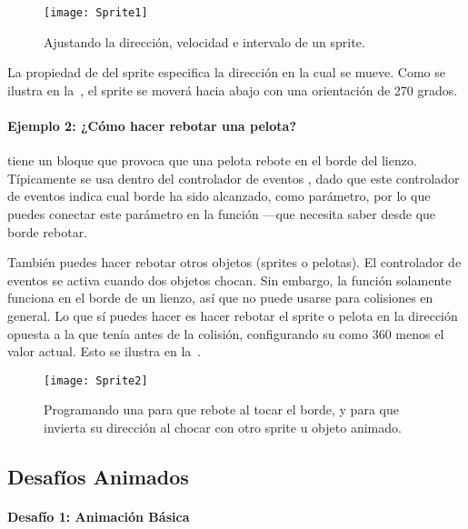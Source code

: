 \begin{figure}[H]
\centering
\texttt{[image: Sprite1]}
\caption{Ajustando la dirección, velocidad e intervalo de un sprite.}
\label{fig:Sprite1}
\end{figure}

La propiedad de  del sprite especifica la
dirección en la cual se mueve. Como se ilustra en
la~, el sprite se moverá hacia abajo con una
orientación de 270 grados.

\paragraph{Ejemplo 2: ¿Cómo hacer rebotar una pelota?}

\AppInventor tiene un bloque  que provoca que una pelota
rebote en el borde del lienzo. Típicamente se usa  dentro
del controlador de eventos , dado que este
controlador de eventos indica cual borde ha sido alcanzado, como
parámetro, por lo que puedes conectar este parámetro en la función
---que necesita saber desde que borde rebotar.

También puedes hacer rebotar otros objetos (sprites o pelotas). El
controlador de eventos  se activa cuando dos
objetos chocan. Sin embargo, la función  solamente
funciona en el borde de un lienzo, así que no puede usarse para
colisiones en general. Lo que sí puedes hacer es hacer rebotar el
sprite o pelota en la dirección opuesta a la que tenía antes de la
colisión, configurando su  como 360 menos el
valor actual. Esto se ilustra en la~.

\begin{figure}[H]
\vspace{3em}
\centering
\texttt{[image: Sprite2]}
\caption{Programando una  para que rebote al tocar
  el borde, y para que invierta su dirección al chocar con otro sprite
u objeto animado.}
\label{fig:Sprite2}
\end{figure}

\subsection*{Desafíos Animados}

\paragraph{Desafío 1: Animación Básica}

